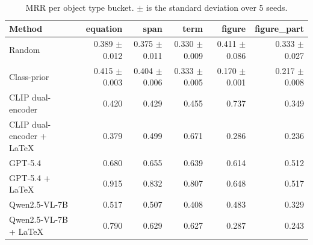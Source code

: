 \begin{table}[t]
\centering
\caption{MRR per object type bucket. $\pm$ is the standard deviation over 5 seeds.}
\label{tab:bd_object_type_mrr}
\begin{tabular}{lrrrrr}
\toprule
Method & equation & span & term & figure & figure\_part \\
\midrule
Random & 0.389 $\pm$ 0.012 & 0.375 $\pm$ 0.011 & 0.330 $\pm$ 0.009 & 0.411 $\pm$ 0.086 & 0.333 $\pm$ 0.027 \\
Class-prior & 0.415 $\pm$ 0.003 & 0.404 $\pm$ 0.006 & 0.333 $\pm$ 0.005 & 0.170 $\pm$ 0.001 & 0.217 $\pm$ 0.008 \\
CLIP dual-encoder & 0.420 & 0.429 & 0.455 & 0.737 & 0.349 \\
CLIP dual-encoder + LaTeX & 0.379 & 0.499 & 0.671 & 0.286 & 0.236 \\
GPT-5.4 & 0.680 & 0.655 & 0.639 & 0.614 & 0.512 \\
GPT-5.4 + LaTeX & 0.915 & 0.832 & 0.807 & 0.648 & 0.517 \\
Qwen2.5-VL-7B & 0.517 & 0.507 & 0.408 & 0.483 & 0.329 \\
Qwen2.5-VL-7B + LaTeX & 0.790 & 0.629 & 0.627 & 0.287 & 0.243 \\
\bottomrule
\end{tabular}
\end{table}
